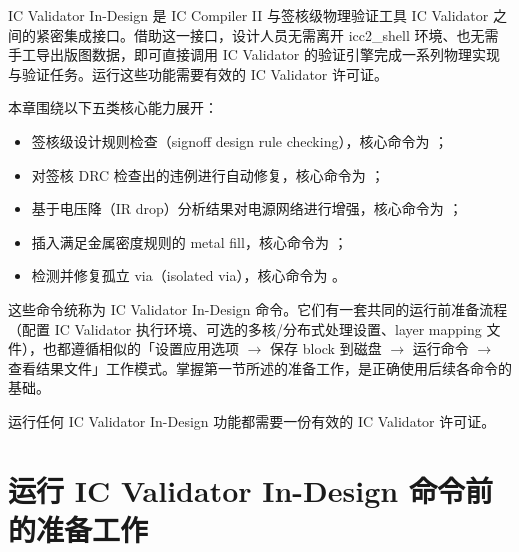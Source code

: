 \label{chap:icv}


IC Validator In-Design 是 IC Compiler II 与签核级物理验证工具 IC Validator 之间的紧密集成接口。借助这一接口，设计人员无需离开 icc2\_shell 环境、也无需手工导出版图数据，即可直接调用 IC Validator 的验证引擎完成一系列物理实现与验证任务。运行这些功能需要有效的 IC Validator 许可证。

本章围绕以下五类核心能力展开：
\begin{itemize}
  \item 签核级设计规则检查（signoff design rule checking），核心命令为 ；
  \item 对签核 DRC 检查出的违例进行自动修复，核心命令为 ；
  \item 基于电压降（IR drop）分析结果对电源网络进行增强，核心命令为 ；
  \item 插入满足金属密度规则的 metal fill，核心命令为 ；
  \item 检测并修复孤立 via（isolated via），核心命令为 。
\end{itemize}

这些命令统称为 IC Validator In-Design 命令。它们有一套共同的运行前准备流程（配置 IC Validator 执行环境、可选的多核/分布式处理设置、layer mapping 文件），也都遵循相似的「设置应用选项 $\to$ 保存 block 到磁盘 $\to$ 运行命令 $\to$ 查看结果文件」工作模式。掌握第一节所述的准备工作，是正确使用后续各命令的基础。

\begin{noteBox}
运行任何 IC Validator In-Design 功能都需要一份有效的 IC Validator 许可证。
\end{noteBox}

\section{运行 IC Validator In-Design 命令前的准备工作}
